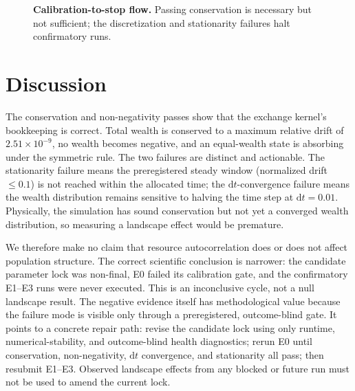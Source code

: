 \documentclass[aps,prl,reprint,superscriptaddress,amsmath,amssymb]{revtex4-2}
\begin{document}
\begin{figure}[htbp]
\centering
{}
\caption{\textbf{Calibration-to-stop flow.} Passing conservation is necessary but not sufficient; the discretization and stationarity failures halt confirmatory runs.}
\label{fig:gate}
\end{figure}

\section{Discussion}

The conservation and non-negativity passes show that the exchange kernel's bookkeeping is correct. Total wealth is conserved to a maximum relative drift of $2.51\times10^{-9}$, no wealth becomes negative, and an equal-wealth state is absorbing under the symmetric rule. The two failures are distinct and actionable. The stationarity failure means the preregistered steady window (normalized drift $\le0.1$) is not reached within the allocated time; the $\mathrm{d}t$-convergence failure means the wealth distribution remains sensitive to halving the time step at $\mathrm{d}t=0.01$. Physically, the simulation has sound conservation but not yet a converged wealth distribution, so measuring a landscape effect would be premature.

We therefore make no claim that resource autocorrelation does or does not affect population structure. The correct scientific conclusion is narrower: the candidate parameter lock was non-final, E0 failed its calibration gate, and the confirmatory E1--E3 runs were never executed. This is an inconclusive cycle, not a null landscape result. The negative evidence itself has methodological value because the failure mode is visible only through a preregistered, outcome-blind gate. It points to a concrete repair path: revise the candidate lock using only runtime, numerical-stability, and outcome-blind health diagnostics; rerun E0 until conservation, non-negativity, $\mathrm{d}t$ convergence, and stationarity all pass; then resubmit E1--E3. Observed landscape effects from any blocked or future run must not be used to amend the current lock.
\end{document}
